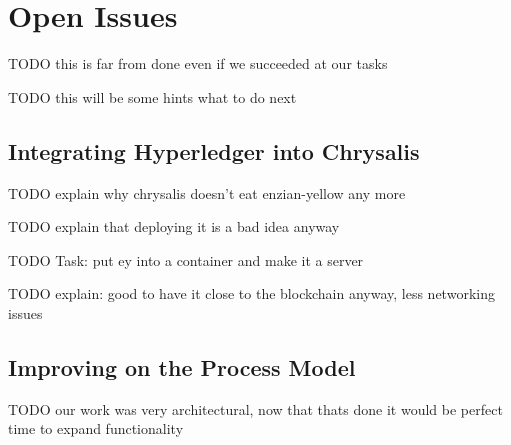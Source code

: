 %
\chapter{Open Issues}
\label{sec:issues}

TODO this is far from done even if we succeeded at our tasks

TODO this will be some hints what to do next 

\section{Integrating Hyperledger into Chrysalis}
\label{sec:issues:intrgration}

TODO explain why chrysalis doesn't eat enzian-yellow any more

TODO explain that deploying it is a bad idea anyway

TODO Task: put ey into a container and make it a server

TODO explain: good to have it close to the blockchain anyway, less networking issues

\section{Improving on the Process Model}
\label{sec:issues:bpm}

TODO our work was very architectural, now that thats done it would be perfect time to expand functionality